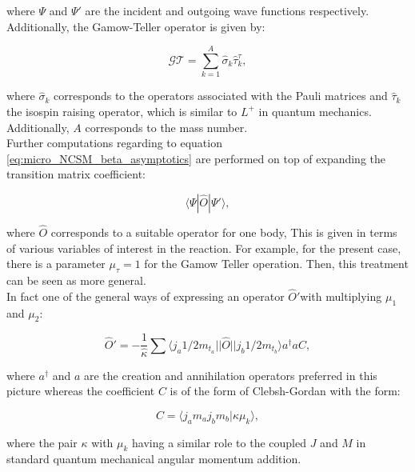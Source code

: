 \documentclass[openany]{book}
\begin{document}
where $\Psi$ and $\Psi'$ are the incident and outgoing wave functions respectively. Additionally, the Gamow-Teller operator is given by: 

 \begin{equation}\label{eq:micro_NCSM_beta_GToperator}
 	\mathcal{GT} = \sum_{k = 1}^{A} \hat \sigma_k \hat \tau_k^{\tau},
 \end{equation}

where $\hat \sigma_k$ corresponds to the operators associated with the Pauli matrices and $\hat \tau_k$ the isospin raising operator, which is similar to $L^{+}$ in quantum mechanics. Additionally, $A$ corresponds to the mass number. \\ 

Further computations regarding to equation \ref{eq:micro_NCSM_beta_asymptotics} are performed on top of expanding the transition matrix coefficient: 


\begin{equation}\label{eq:micro_NCSM_beta_transition}
	\langle \Psi | \hat O |  \Psi ' \rangle,
\end{equation}

where $ \hat O$ corresponds to a suitable operator for one body, This is given in terms of various variables of interest in the reaction. For example, for the present case, there is a parameter $\mu_\tau = 1$ for the Gamow Teller operation. Then, this treatment can be seen as more general. \\

In fact one of the general ways of expressing an operator  $\hat O' $with multiplying $\mu_1$ and $\mu_2$:

\begin{equation}\label{eq:micro_NCSM_beta_operator}
	 \hat O ' = - \frac{1}{\hat \kappa} \sum \langle j_a 1/2 m_{t_a} || \hat O || j_b 1/2 m_{t_b} \rangle a^{\dagger} a C,
\end{equation}

where $a^{\dagger}$ and $a$ are the creation and annihilation operators preferred in this picture whereas the coefficient $C$ is of the form of Clebsh-Gordan with the form: 

\begin{equation}\label{eq:micro_NCSM_beta_coefficient}
	C = \langle j_a m_a j_b m_b | \kappa \mu_k \rangle,
\end{equation}

where the pair $\kappa$ with $\mu_k$ having a similar role to the coupled $J$ and $M$ in standard quantum mechanical angular momentum addition.  \\
\end{document}
